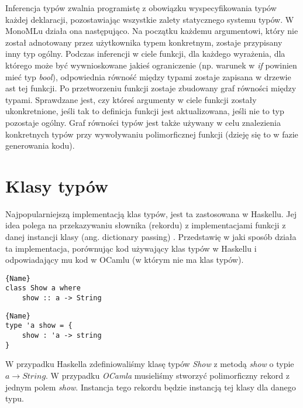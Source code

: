 \documentclass[declaration,shortabstract]{iithesis}
\begin{document}
Inferencja typów zwalnia programistę z obowiązku wyspecyfikowania typów 
każdej deklaracji, pozostawiając wszystkie zalety statycznego systemu typów.
W MonoMLu działa ona następująco. Na początku każdemu argumentowi,
który nie został adnotowany przez użytkownika typem konkretnym, zostaje 
przypisany inny typ ogólny. Podczas inferencji w ciele funkcji, dla 
każdego wyrażenia, dla którego może być wywnioskowane jakieś ograniczenie 
(np. warunek w \textit{if} powinien mieć typ \textit{bool}), odpowiednia 
równość między typami zostaje zapisana w drzewie ast tej funkcji. Po 
przetworzeniu funkcji zostaje zbudowany graf równości między typami. 
Sprawdzane jest, czy któreś argumenty w ciele funkcji zostały ukonkretnione, 
jeśli tak to definicja funkcji jest aktualizowana, jeśli nie to typ pozostaje
ogólny. Graf równości typów jest także używany w celu znalezienia konkretnych 
typów przy wywoływaniu polimorficznej funkcji (dzieję się to w fazie 
generowania kodu). 

\section{Klasy typów}
Najpopularniejszą implementacją klas typów, jest ta zastosowana w Haskellu. 
Jej idea polega na przekazywaniu słownika (rekordu) z implementacjami funkcji 
z danej instancji klasy (ang. dictionary passing) 
\cite{type_class_wadler88, implementing_type_classes}. Przedstawię w jaki sposób 
działa ta implementacja, porównując kod używający klas typów w Haskellu i 
odpowiadający mu kod w OCamlu (w którym nie ma klas typów).

\noindent\begin{minipage}{.45\textwidth}
\begin{lstlisting}[caption=Deklaracja klasy typów w Haskellu, frame=tlrb]{Name}
class Show a where 
    show :: a -> String
\end{lstlisting}
\end{minipage}\hfill
\begin{minipage}{.45\textwidth}
\begin{lstlisting}[caption=Deklaracja odpowiednika klasy typów w OCamlu z
użyciem metody przekazywania słownika, frame=tlrb]{Name}
type 'a show = { 
    show : 'a -> string 
} 
\end{lstlisting}
\end{minipage}

W przypadku Haskella zdefiniowaliśmy klasę typów \textit{Show} z metodą 
\textit{show} o typie $a \rightarrow String$. W przypadku \textit
{OCamla} musieliśmy stworzyć polimorficzny rekord z jednym polem \textit{show}.
Instancja tego rekordu będzie instancją tej klasy dla danego typu. 
\end{document}
